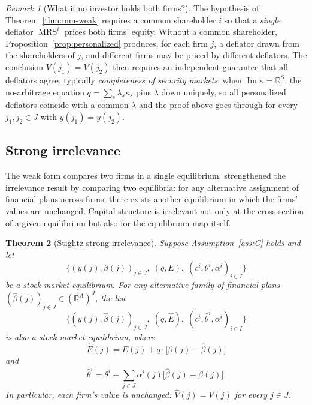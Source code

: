 \documentclass[11pt,a4paper,oneside]{book}
\def\R{\mathbb{R}}
\DeclareMathOperator{\MRS}{MRS}
\DeclareMathOperator{\Range}{Im}
\theoremstyle{plain}
\newtheorem{theorem}{Theorem}[chapter]
\theoremstyle{definition}
\theoremstyle{remark}
\newtheorem{remark}[theorem]{Remark}
\numberwithin{equation}{chapter}
\begin{document}
\begin{remark}[What if no investor holds both firms?]\label{rem:mm-no-common}
The hypothesis of Theorem~\ref{thm:mm-weak} requires a common shareholder $i$ so that a \emph{single} deflator $\MRS^i$ prices both firms' equity.
Without a common shareholder, Proposition~\ref{prop:personalized} produces, for each firm $j$, a deflator drawn from the shareholders of $j$, and different firms may be priced by different deflators.
The conclusion $V(j_1) = V(j_2)$ then requires an independent guarantee that all deflators agree, typically \emph{completeness of security markets}: when $\Range \kappa = \R^S$, the no-arbitrage equation $q = \sum_s \lambda_s \kappa_s$ pins $\lambda$ down uniquely, so all personalized deflators coincide with a common $\lambda$ and the proof above goes through for every $j_1, j_2 \in J$ with $y(j_1) = y(j_2)$.
\end{remark}

\subsection{Strong irrelevance}

The weak form compares two firms in a single equilibrium.
\citet{Stiglitz1969, Stiglitz1974} strengthened the irrelevance result by comparing two equilibria: for any alternative assignment of financial plans across firms, there exists another equilibrium in which the firms' values are unchanged.
Capital structure is irrelevant not only at the cross-section of a given equilibrium but also for the equilibrium map itself.

\begin{theorem}[Stiglitz strong irrelevance]\label{thm:stiglitz}
Suppose Assumption~\ref{ass:C} holds and let
\begin{equation*}
  \bigl\{ (y(j), \beta(j))_{j \in J}, \; (q, E), \; (c^i, \theta^i, \alpha^i)_{i \in I} \bigr\}
\end{equation*}
be a stock-market equilibrium.
For any alternative family of financial plans $(\widehat{\beta}(j))_{j \in J} \in (\R^A)^J$, the list
\begin{equation*}
  \bigl\{ (y(j), \widehat{\beta}(j))_{j \in J}, \; (q, \widehat{E}), \; (c^i, \widehat{\theta}^i, \alpha^i)_{i \in I} \bigr\}
\end{equation*}
is also a stock-market equilibrium, where
\begin{equation}\label{eq:stiglitz-prices}
  \widehat{E}(j) = E(j) + q \cdot \bigl[ \beta(j) - \widehat{\beta}(j) \bigr]
\end{equation}
and
\begin{equation}\label{eq:stiglitz-portfolios}
  \widehat{\theta}^i = \theta^i + \sum_{j \in J} \alpha^i(j) \bigl[ \widehat{\beta}(j) - \beta(j) \bigr].
\end{equation}
In particular, each firm's value is unchanged: $\widehat{V}(j) = V(j)$ for every $j \in J$.
\end{theorem}
\end{document}
